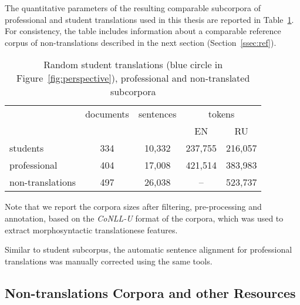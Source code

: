 The quantitative parameters of the resulting comparable subcorpora of professional and student translations used in this thesis are reported in Table~\ref{tab:vars}. For consistency, the table includes information about a comparable reference corpus of non-translations described in the next section (Section~\ref{ssec:ref}).
\vspace{-1em}
\begin{table}[H]
	\centering
	\begin{tabular}{l|c|c|cc}
	\toprule
	
	             & documents & sentences & \multicolumn{2}{c}{tokens} \\
				 &      &        & EN      &  RU \\
	\midrule
	students     & 334  & 10,332 & 237,755 & 216,057 \\  
	professional & 404  & 17,008 & 421,514 & 383,983 \\ 
	non-translations & 497  & 26,038 & -- & 523,737 \\  
	\bottomrule
\end{tabular}
	\caption{\label{tab:vars} Random student translations (blue circle in Figure~\ref{fig:perspective}), professional and non-translated subcorpora}
\end{table}
\vspace{-1em}

Note that we report the corpora sizes after filtering, pre-processing and annotation, based on the \textit{CoNLL-U} format of the corpora, which was used to extract morphosyntactic translationese features.

Similar to student subcorpus, the automatic sentence alignment for professional translations was manually corrected using the same tools. 

\subsection{\label{ssec:ref}Non-translations Corpora and other Resources}

